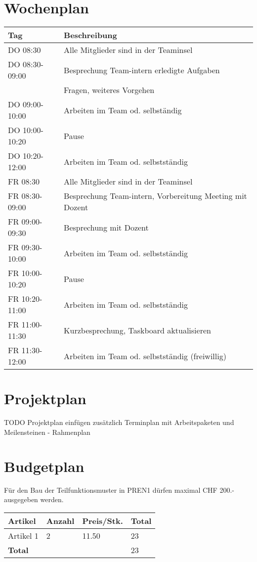 \documentclass[a4paper]{report}
\begin{document}
\section{Wochenplan}
\begin{tabular}{|l|l|}
	\hline 
	\textbf{Tag} & \textbf{Beschreibung} \\
	\hline
	DO 08:30 & Alle Mitglieder sind in der Teaminsel \\
	\hline
	DO 08:30-09:00 & Besprechung Team-intern erledigte Aufgaben \\
	& Fragen, weiteres Vorgehen \\
	\hline
	DO 09:00-10:00 & Arbeiten im Team od. selbständig \\
	\hline
	DO 10:00-10:20 & Pause \\
	\hline
	DO 10:20-12:00 & Arbeiten im Team od. selbstständig \\
	\hline
	FR 08:30 & Alle Mitglieder sind in der Teaminsel \\
	\hline
	FR 08:30-09:00 & Besprechung Team-intern, Vorbereitung Meeting mit Dozent \\
	\hline
	FR 09:00-09:30& Besprechung mit Dozent \\
	\hline
	FR 09:30-10:00 & Arbeiten im Team od. selbstständig \\
	\hline
	FR 10:00-10:20 & Pause \\
	\hline
	FR 10:20-11:00 & Arbeiten im Team od. selbstständig \\
	\hline
	FR 11:00-11:30 & Kurzbesprechung, Taskboard aktualisieren \\
	\hline
	FR 11:30-12:00 & Arbeiten im Team od. selbstständig (freiwillig)\\
	\hline
\end{tabular}

\section{Projektplan}
TODO Projektplan einfügen zusätzlich Terminplan mit Arbeitspaketen und Meilensteinen - Rahmenplan

\section{Budgetplan}
Für den Bau der Teilfunktionsmuster in PREN1 dürfen maximal CHF 200.- ausgegeben werden.

\begin{tabular}{|l|l|l|l|}
	\hline
	\textbf{Artikel} & \textbf{Anzahl} & \textbf{Preis/Stk.} & \textbf{Total} \\
	\hline
	Artikel 1 & 2 & 11.50 & 23 \\
	\hline
	\textbf{Total} & & & 23 \\
	\hline
\end{tabular}
	
\end{document}
